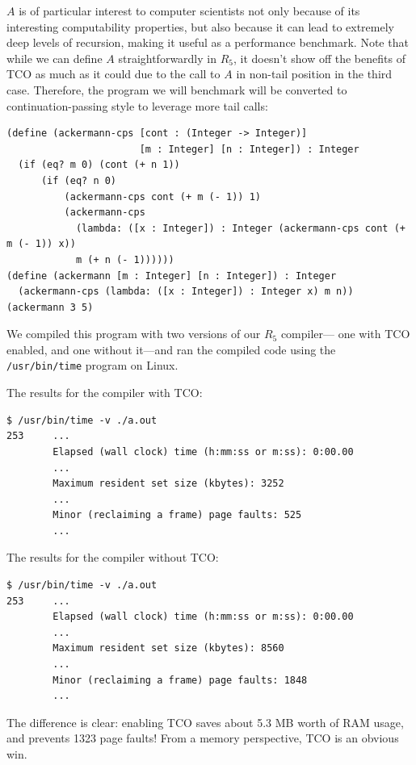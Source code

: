 \documentclass[12pt]{article}
\begin{document}
$A$ is of particular interest to computer scientists not only
because of its interesting computability properties, but also because it can lead
to extremely deep levels of recursion, making it useful as a performance benchmark.
Note that while we can define $A$ straightforwardly in $R_5$, it doesn't show off
the benefits of TCO as much as it could due to the call to $A$ in non-tail position
in the third case. Therefore, the program we will benchmark will be converted
to continuation-passing style to leverage more tail calls:

\begin{verbatim}
(define (ackermann-cps [cont : (Integer -> Integer)]
                       [m : Integer] [n : Integer]) : Integer
  (if (eq? m 0) (cont (+ n 1))
      (if (eq? n 0)
          (ackermann-cps cont (+ m (- 1)) 1)
          (ackermann-cps
            (lambda: ([x : Integer]) : Integer (ackermann-cps cont (+ m (- 1)) x))
            m (+ n (- 1))))))
(define (ackermann [m : Integer] [n : Integer]) : Integer
  (ackermann-cps (lambda: ([x : Integer]) : Integer x) m n))
(ackermann 3 5)
\end{verbatim}

We compiled this program with two versions of our $R_5$ compiler---
one with TCO enabled, and one without it---and ran the compiled code
using the \verb+/usr/bin/time+ program on Linux.

The results for the compiler with TCO:

\begin{verbatim}
$ /usr/bin/time -v ./a.out 
253     ...
        Elapsed (wall clock) time (h:mm:ss or m:ss): 0:00.00
        ...
        Maximum resident set size (kbytes): 3252
        ...
        Minor (reclaiming a frame) page faults: 525
        ...
\end{verbatim}

The results for the compiler without TCO:

\begin{verbatim}
$ /usr/bin/time -v ./a.out 
253     ...
        Elapsed (wall clock) time (h:mm:ss or m:ss): 0:00.00
        ...
        Maximum resident set size (kbytes): 8560
        ...
        Minor (reclaiming a frame) page faults: 1848
        ...
\end{verbatim}

The difference is clear: enabling TCO saves about 5.3 MB worth of RAM usage, and
prevents 1323 page faults! From a memory perspective, TCO is an obvious win.
\end{document}
